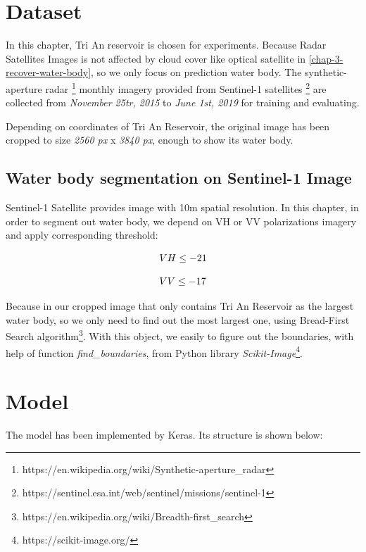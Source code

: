 \section{Dataset} 

In this chapter, Tri An reservoir is chosen for experiments. Because Radar Satellites Images is not affected by cloud cover like optical satellite in \ref{chap-3-recover-water-body}, so we only focus on prediction water body. The synthetic-aperture radar \footnote{https://en.wikipedia.org/wiki/Synthetic-aperture\_radar} monthly imagery provided from Sentinel-1 satellites \footnote{https://sentinel.esa.int/web/sentinel/missions/sentinel-1} are collected from \textit{November 25tr, 2015} to \textit{June 1st, 2019} for training and evaluating. 

Depending on coordinates of Tri An Reservoir, the original image has been cropped to size \textit{2560 px} x \textit{3840 px}, enough to show its water body.

\subsection{Water body segmentation on Sentinel-1 Image}

Sentinel-1 Satellite provides image with 10m spatial resolution. In this chapter, in order to segment out water body, we depend on VH or VV polarizations imagery and apply corresponding threshold:

\begin{equation}
\centering
VH \leq -21
\end{equation} 

\begin{equation}
\centering
VV \leq -17
\end{equation} 

Because in our cropped image that only contains Tri An Reservoir as the largest water body, so we only need to find out the most largest one, using Bread-First Search algorithm\footnote{https://en.wikipedia.org/wiki/Breadth-first\_search}. With this object, we easily to figure out the boundaries, with help of function \textit{find\_boundaries}, from Python library \textit{Scikit-Image}\footnote{https://scikit-image.org/}.

\pagebreak
\section{Model}

The model has been implemented by Keras. Its structure is shown below:

